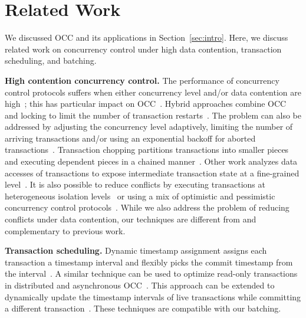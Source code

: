 \section{Related Work}\label{sec:relwork}
We discussed OCC and its applications in Section~\ref{sec:intro}. 
Here, we discuss related work on concurrency control under high data contention, transaction scheduling, and batching. 

{\bf High contention concurrency control.}
The performance of concurrency control protocols suffers when either concurrency level and/or data contention are high~\cite{franaszek1985limitations, appuswamy17vldb}; this has particular impact on OCC~\cite{agrawal1987concurrency}. Hybrid approaches combine OCC and locking to limit the number of transaction restarts~\cite{thomasian1998distributed,yu1992analysis}. The problem can also be addressed by adjusting the concurrency level adaptively, limiting the number of arriving transactions and/or using an exponential backoff for aborted transactions~. Transaction chopping partitions transactions into smaller pieces and executing dependent pieces in a chained manner~\cite{mu2014extracting,shasha1995transaction,xie2015high}. Other work analyzes data accesses of transactions to expose intermediate transaction state at a fine-grained level~\cite{wang2016scaling}. It is also possible to reduce conflicts by executing transactions at heterogeneous isolation levels~\cite{xie2014salt,xie2015high} or using a mix of optimistic and pessimistic concurrency control protocols~\cite{wang2016mostly}.
While we also address the problem of reducing conflicts under data contention, our techniques are different from and complementary to previous work.

{\bf Transaction scheduling.}
Dynamic timestamp assignment assigns each transaction a timestamp interval and flexibly picks the commit timestamp from the interval~\cite{bayer1982dynamic}. A similar technique can be used to optimize read-only transactions in distributed and asynchronous OCC~\cite{ding2015centiman}. This approach can be extended to dynamically update the timestamp intervals of live transactions while committing a different transaction~\cite{boksenbaum1987concurrent}.
 These techniques are compatible with our batching.

